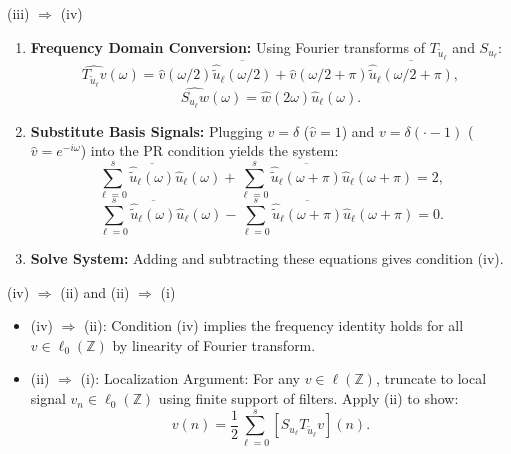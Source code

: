 \documentclass[11pt]{beamer}
\begin{document}
\begin{frame}{(iii) $\Rightarrow$ (iv)}
  \begin{enumerate}
    \item \textbf{Frequency Domain Conversion:} Using Fourier transforms of $T_{\tilde{u}_\ell}$ and $S_{u_\ell}$:
          \[
            \widehat{T_{\tilde{u}_\ell} v}(\omega) = \hat{v}(\omega/2)\overline{\hat{\tilde{u}}_\ell(\omega/2)} + \hat{v}(\omega/2+\pi)\overline{\hat{\tilde{u}}_\ell(\omega/2+\pi)},
          \]
          \[
            \widehat{S_{u_\ell} w}(\omega) = \hat{w}(2\omega)\hat{u}_\ell(\omega).
          \]

    \item \textbf{Substitute Basis Signals:} Plugging $v = \delta$ ($\hat{v}=1$) and $v = \delta(\cdot-1)$ ($\hat{v}=e^{-i\omega}$) into the PR condition yields the system:
          \[
            \sum_{\ell=0}^s \overline{\hat{\tilde{u}}_\ell(\omega)}\hat{u}_\ell(\omega) + \sum_{\ell=0}^s \overline{\hat{\tilde{u}}_\ell(\omega+\pi)}\hat{u}_\ell(\omega+\pi) = 2,
          \]
          \[
            \sum_{\ell=0}^s \overline{\hat{\tilde{u}}_\ell(\omega)}\hat{u}_\ell(\omega) - \sum_{\ell=0}^s \overline{\hat{\tilde{u}}_\ell(\omega+\pi)}\hat{u}_\ell(\omega+\pi) = 0.
          \]

    \item \textbf{Solve System:} Adding and subtracting these equations gives condition (iv).
  \end{enumerate}
\end{frame}

\begin{frame}{(iv) $\Rightarrow$ (ii) and (ii) $\Rightarrow$ (i)}
  \begin{itemize}
    \item (iv) $\Rightarrow$ (ii): Condition (iv) implies the frequency identity holds for all $v \in \ell_0(\mathbb{Z})$ by linearity of Fourier transform.
    \item (ii) $\Rightarrow$ (i):  {Localization Argument:} For any $v \in \ell(\mathbb{Z})$, truncate to local signal $v_n \in \ell_0(\mathbb{Z})$ using finite support of filters. Apply (ii) to show:
          \[
            v(n) = \frac{1}{2}\sum_{\ell=0}^s [S_{u_\ell} T_{\tilde{u}_\ell} v](n).
          \]
  \end{itemize}
\end{frame}
\end{document}

